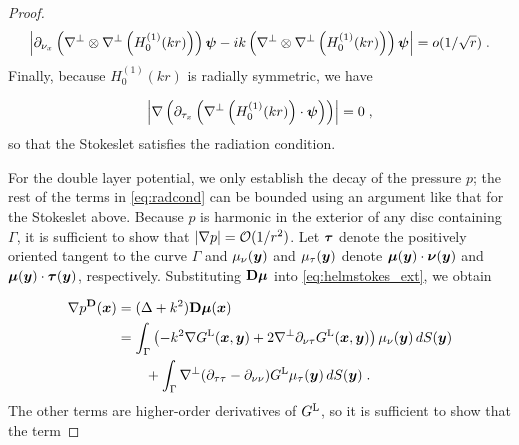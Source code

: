 \begin{proof}
\begin{equation}
\left | \partial_{{\nu_x}} \left(\nabla^\perp \otimes
\nabla^\perp \left (H_0^{(1)} (kr) \right ) \right){\boldsymbol \psi}
- ik \left(\nabla^\perp \otimes \nabla^\perp
\left (H_0^{(1)} (kr) \right ) \right){\boldsymbol \psi} \right | =
o ( 1/\sqrt{r} ) \; .
\end{equation}
Finally, because $H_0^{(1)}(kr)$ is radially symmetric,
we have

\begin{equation}
\left | \nabla \left( \partial_{\tau_x} \left ( 
\nabla^\perp \left (H_0^{(1)} (kr) \right ) \cdot {\boldsymbol \psi}  \right )
\right) \right | = 0 \; ,
\end{equation}
so that the Stokeslet satisfies the radiation condition.

For the double layer potential, we only establish the
decay of the pressure $p$; the rest of the terms
in \eqref{eq:radcond} can be bounded using an argument
like that for the Stokeslet above.
Because $p$ is harmonic in the exterior of any disc
containing $\Gamma$, it is sufficient to show that
$|\nabla p| = \mathcal{O} (1/r^2)$. Let ${\boldsymbol \tau}$ denote the
positively oriented tangent to the curve $\Gamma$ and
$\mu_\nu({\boldsymbol y})$ and $\mu_\tau({\boldsymbol y})$ denote ${\boldsymbol \mu}({\boldsymbol y}) \cdot {\boldsymbol \nu}({\boldsymbol y})$ and
${\boldsymbol \mu}({\boldsymbol y}) \cdot {\boldsymbol \tau}({\boldsymbol y})$, respectively. Substituting
${\bf D} {\boldsymbol \mu}$ into \eqref{eq:helmstokes_ext}, we obtain

\begin{align}
\nabla p^{\bf D}({\boldsymbol x}) &= (\Delta + k^2) {\bf D} {\boldsymbol \mu}({\boldsymbol x}) \\
&= \int_\Gamma \left (-k^2 \nabla G^{\textrm{L}} ({\boldsymbol x},{\boldsymbol y}) +
2 \nabla^\perp \partial_{\nu\tau} G^{\textrm{L}} ({\boldsymbol x},{\boldsymbol y}) \right ) \mu_\nu({\boldsymbol y})
\, dS({\boldsymbol y}) \\
& \qquad + \int_\Gamma \nabla^\perp (\partial_{\tau\tau}-\partial_{\nu\nu})G^{\textrm{L}} \mu_\tau({\boldsymbol y})
\, dS({\boldsymbol y}) \; .
\end{align}
The other terms are higher-order derivatives
of $G^{\textrm{L}}$, so it is sufficient to show that the term


\end{proof}

